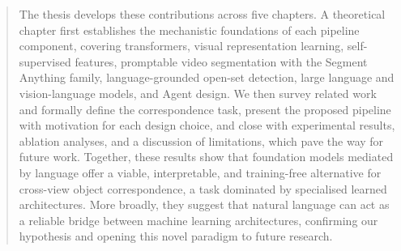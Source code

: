 \begin{abstract}
The thesis develops these contributions across five chapters. A theoretical chapter first establishes the mechanistic foundations of each pipeline component, covering transformers, visual representation learning, self-supervised features, promptable video segmentation with the Segment Anything family, language-grounded open-set detection, large language and vision-language models, and Agent design. We then survey related work and formally define the correspondence task, present the proposed pipeline with motivation for each design choice, and close with experimental results, ablation analyses, and a discussion of limitations, which pave the way for future work. Together, these results show that foundation models mediated by language offer a viable, interpretable, and training-free alternative for cross-view object correspondence, a task dominated by specialised learned architectures. More broadly, they suggest that natural language can act as a reliable bridge between machine learning architectures, confirming our hypothesis and opening this novel paradigm to future research.
\end{abstract}
